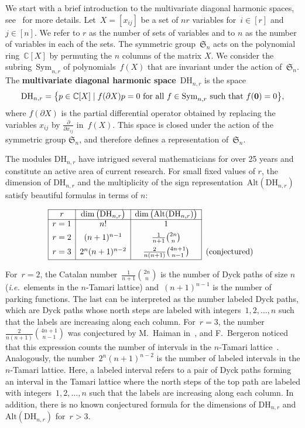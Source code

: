\documentclass{amsart}
\theoremstyle{definition}
\newcommand{\C}{\mathbb{C}} %
\newcommand{\bigset}[2]{\big\{ #1 \;|\; #2 \big\}} %
\newcommand{\ie}{\textit{i.e.}~} %
\newcommand{\defn}[1]{\textbf{\textsf{\color{PineGreen} #1}}} %
\newcommand{\fS}{\mathfrak{S}} %
\newcommand{\DiagHarm}[2]{\mathrm{DH}_{#1,#2}} %
\newcommand{\Sym}[2]{\mathrm{Sym}_{#1,#2}} %
\newcommand{\Alt}{\mathrm{Alt}} %
\begin{document}
We start with a brief introduction to the multivariate diagonal harmonic spaces, see~\cite{Bergeron-multivariateDiagonalCoinvariantSpaces} for more details. 
Let~$X=[x_{ij}]$ be a set of $nr$ variables for~$i \in [r]$ and~$j \in [n]$. 
We refer to $r$ as the number of sets of variables and to $n$ as the number of variables in each of the sets.
The symmetric group~$\fS_n$ acts on the polynomial ring~$\C[X]$ by permuting the $n$ columns of the matrix $X$. 
We consider the subring~$\Sym{n}{r}$ of polynomials~$f(X)$ that are invariant under the action of~$\fS_n$.
The \defn{multivariate diagonal harmonic space}~$\DiagHarm{n}{r}$ is the space
\[
\DiagHarm{n}{r} = \bigset{p\in \C[X]}{f(\partial X)p = 0 \text{ for all } f\in \Sym{n}{r} \text{ such that } f({\bf 0}) = 0},
\]
where $f(\partial X)$ is the partial differential operator obtained by replacing the variables $x_{ij}$ by $\frac{\partial}{\partial x_{ij}}$ in~$f(X)$.
This space is closed under the action of the symmetric group $\fS_n$, and therefore defines a representation of~$\fS_n$. 

The modules $\DiagHarm{n}{r}$ have intrigued several mathematicians for over 25 years and constitute an active area of current research. 
For small fixed values of $r$, the dimension of $\DiagHarm{n}{r}$ and 
the multiplicity of the sign representation~$\Alt(\DiagHarm{n}{r})$ satisfy beautiful formulas in terms of $n$: 

\[
\begin{array}{|c|c|c|c}
\cline{1-3}
r & \dim \big( \DiagHarm{n}{r} \big) & \dim \big( \Alt(\DiagHarm{n}{r}) \big)\\
\cline{1-3}
r = 1 & n! & 1 \\[4pt]
r = 2 & (n+1)^{n-1} & \frac{1}{n+1}{2n\choose n} \\[5pt]
r = 3 & 2^n (n+1)^{n-2} & \frac{2}{n(n+1)} {4n+1\choose n-1} & \text{(conjectured)} \\[3pt]
\cline{1-3}
\end{array}
\]

\bigskip
For~$r=2$, the Catalan number~$\frac{1}{n+1}{2n\choose n}$ is the number of Dyck paths of size $n$ (\ie elements in the $n$-Tamari lattice) and~$(n+1)^{n-1}$ is the number of parking functions. 
The last can be interpreted as the number labeled Dyck paths, which are Dyck paths whose north steps are labeled with integers~$1, 2, \dots, n$ such that the labels are increasing along each column. 
For~$r=3$, the number~$\frac{2}{n(n+1)} {4n+1\choose n-1}$ was conjectured by M.~Haiman in~\cite{Haiman-conjectures}, and F.~Bergeron noticed that this expression counts the number of intervals in the $n$-Tamari lattice~\cite{Chapoton-intervalsTamari}. 
Analogously, the number~$2^n(n+1)^{n-2}$ is the number of labeled intervals in the $n$-Tamari lattice.
Here, a labeled interval refers to a pair of Dyck paths forming an interval in the Tamari lattice where the north steps of the top path are labeled with integers~$1, 2, \dots, n$ such that the labels are increasing along each column. 
In addition, there is no known conjectured formula for the dimensions of $\DiagHarm{n}{r}$ and $\Alt(\DiagHarm{n}{r})$ for~$r > 3$.
\end{document}
